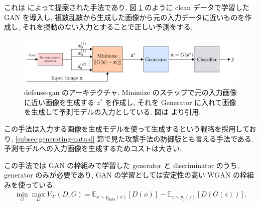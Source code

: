 これは \cite{samangouei2018defense} によって提案された手法であり, 図 \ref{fig:defense-gan-architecture} のように clean データで学習した GAN を導入し, 複数乱数から生成した画像から元の入力データに近いものを作成し, それを摂動のない入力とすることで正しい予測をする.
%
\begin{figure}[htbp]
\begin{center}
\includegraphics[width=14.0cm]{figures/defense-gan-architecture.pdf}
\end{center}
\caption{
defense-gan のアーキテクチャ.
Minimize のステップで元の入力画像に近い画像を生成する $z^*$ を作成し, それを Generator に入れて画像を生成して予測モデルの入力としている.
図は \cite{samangouei2018defense} より引用.
}
\label{fig:defense-gan-architecture}
\end{figure}
%

この手法は入力する画像を生成モデルを使って生成するという戦略を採用しており, \ref{subsec:generating-natual} 節で見た攻撃手法の防御版とも言える手法である.
予測モデルへの入力画像を生成するためコストは大きい.

この手法では GAN の枠組みで学習した generator と discriminator のうち, generator のみが必要であり, GAN の学習としては安定性の高い WGAN \cite{arjovsky2017wasserstein} の枠組みを使っている.
%
\begin{eqnarray}
\min_G \max_D V_{W} (D, G) = \mathbb{E}_{x \sim p_{\text{data}} (x)} \left[ D(x) \right] - \mathbb{E}_{z \sim p_{z} (z)} \left[ D(G(z)) \right].
\label{eq:defense-gan-wgan}
\end{eqnarray}
%

